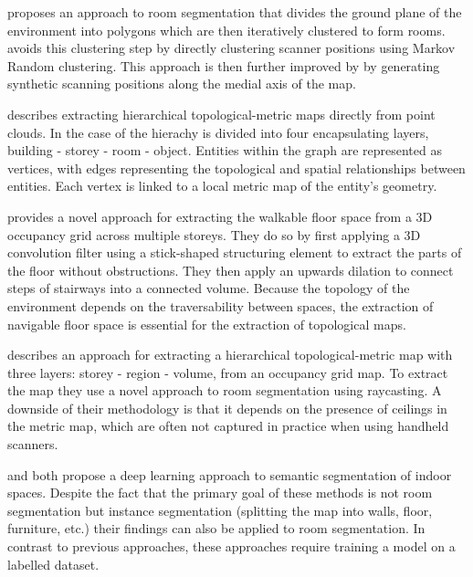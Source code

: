 \citet{mura_automatic_2014} proposes an approach to room segmentation that divides the ground plane of the environment into polygons which are then iteratively clustered to form rooms. \citet{mura_piecewise-planar_2016} avoids this clustering step by directly clustering scanner positions using Markov Random clustering. This approach is then further improved by \citet{ambrus_automatic_2017} by generating synthetic scanning positions along the medial axis of the map. 

\citet{ochmann_towards_2014} describes extracting hierarchical topological-metric maps directly from point clouds. In the case of \citet{ochmann_towards_2014} the hierachy is divided into four encapsulating layers, building - storey - room - object. Entities within the graph are represented as vertices, with edges representing the topological and spatial relationships between entities. Each vertex is linked to a local metric map of the entity's geometry. 

\citet{gorte_navigation_2019} provides a novel approach for extracting the walkable floor space from a 3D occupancy grid across multiple storeys. They do so by first applying a 3D convolution filter using a stick-shaped structuring element to extract the parts of the floor without obstructions. They then apply an upwards dilation to connect steps of stairways into a connected volume. Because the topology of the environment depends on the traversability between spaces, the extraction of navigable floor space is essential for the extraction of topological maps.

\citet{he_hierarchical_2021} describes an approach for extracting a hierarchical topological-metric map with three layers: storey - region - volume, from an occupancy grid map. To extract the map they use a novel approach to room segmentation using raycasting. A downside of their methodology is that it depends on the presence of ceilings in the metric map, which are often not captured in practice when using handheld scanners. 

\citet{ma_semantic_2020} and \citet{tang_bim_2022} both propose a deep learning approach to semantic segmentation of indoor spaces. Despite the fact that the primary goal of these methods is not room segmentation but instance segmentation (splitting the map into walls, floor, furniture, etc.) their findings can also be applied to room segmentation. In contrast to previous approaches, these approaches require training a model on a labelled dataset.


